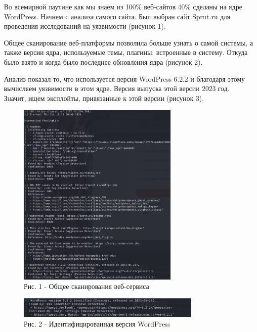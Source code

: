 \begin{multicols}{2}
Во всемирной паутине как мы знаем из 100\% веб-сайтов 40\% сделаны на
ядре WordPress. Начнем с анализа самого сайта. Был выбран сайт Sprut.ru
для проведения исследований на уязвимости (рисунок 1).

Общее сканирование веб-платформы позволила больше узнать о самой
системы, а также версии ядра, используемые темы, плагины, встроенные в
систему. Откуда было взято и когда было последнее обновления ядра
(рисунок 2).

Анализ показал то, что используется версия WordPress 6.2.2 и благодаря
этому вычисляем уязвимости в этом ядре. Версия выпуска этой версии 2023
год. Значит, ищем эксплойты, привязанные к этой версии (рисунок 3).
\end{multicols}

\begin{figure}[H]
	\centering
	\includegraphics[width=0.7\textwidth]{media/ict/image34}
	\caption*{Рис. 1 - Общее сканирования веб-сервиса}
\end{figure}

\begin{figure}[H]
	\centering
	\includegraphics[width=0.8\textwidth]{media/ict/image35}
	\caption*{Рис. 2 - Идентифицированная версия WordPress}
\end{figure}

